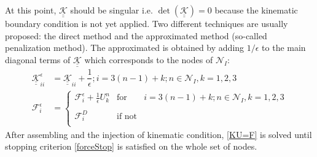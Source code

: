 \documentclass[a4paper,12pt]{article}
\numberwithin{equation}{section}
\theoremstyle{remark}
\begin{document}
At this point, $\underline{\underline{\mathcal{K}}}$ should be singular i.e.  $\det(\underline{\underline{\mathcal{K}}})=0$ because the kinematic boundary condition is not yet applied. Two different techniques are usually proposed: the direct method and the approximated method (so-called penalization method).
The approximated is obtained by adding $1/\epsilon$ to the main diagonal terms of $\underline{\underline{\mathcal{K}}}$ which corresponds to the nodes of $\mathcal{N}_I$:
   \begin{align}
\underline{\underline{\mathcal{K}}}^{\epsilon}_{ii} &= \underline{\underline{\mathcal{K}}}_{ii} + \dfrac{1}{\epsilon}; i = 3(n-1) + k; n \in \mathcal{N}_I, k = 1,2,3\\
\mathcal{F}^\epsilon_i &= \left\{ \begin{array}{rcl}
\mathcal{F}^\epsilon_i + \frac{1}{\epsilon} U_k^n & \mbox{for} & i = 3(n-1) + k; n \in \mathcal{N}_I, k = 1,2,3\\ \\
 \mathcal{F}_i^D & \mbox{if not} \\
\end{array}\right.
\label{penalization}
\end{align} 
After assembling and the injection of kinematic condition, \cref{KU=F} is solved until stopping criterion \cref{forceStop} is satisfied on the whole set of nodes.
\end{document}
